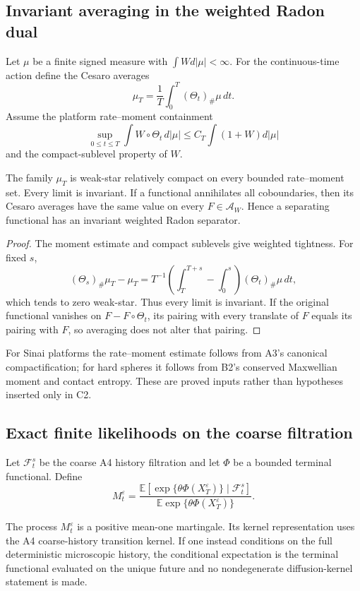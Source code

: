 \subsection{Invariant averaging in the weighted Radon dual}

Let $\mu$ be a finite signed measure with $\int Wd|\mu|<\infty$.  For the
continuous-time action define the Cesaro averages
\[
 \mu_T=\frac1T\int_0^T(\Theta_t)_\#\mu\,dt.
\]
Assume the platform rate--moment containment
\[
 \sup_{0\le t\le T}\int W\circ\Theta_t\,d|\mu|
 \le C_T\int(1+W)d|\mu|
\]
and the compact-sublevel property of $W$.

\begin{lemma}
\label{lem:r7-c2-average}
The family $\mu_T$ is weak-star relatively compact on every bounded
rate--moment set.  Every limit is invariant.  If a functional annihilates all
coboundaries, then its Cesaro averages have the same value on every
$F\in\mathscr A_W$.  Hence a separating functional has an invariant weighted
Radon separator.
\end{lemma}

\begin{proof}
The moment estimate and compact sublevels give weighted tightness.  For fixed
$s$,
\[
 (\Theta_s)_\#\mu_T-\mu_T
 =T^{-1}\left(\int_T^{T+s}-\int_0^s\right)(\Theta_t)_\#\mu\,dt,
\]
which tends to zero weak-star.  Thus every limit is invariant.  If the original
functional vanishes on $F-F\circ\Theta_t$, its pairing with every translate of
$F$ equals its pairing with $F$, so averaging does not alter that pairing.
\end{proof}

For Sinai platforms the rate--moment estimate follows from A3's canonical
compactification; for hard spheres it follows from B2's conserved Maxwellian
moment and contact entropy.  These are proved inputs rather than hypotheses
inserted only in C2.

\subsection{Exact finite likelihoods on the coarse filtration}

Let $\mathcal F_t^s$ be the coarse A4 history filtration and let $\Phi$ be a
bounded terminal functional.  Define
\[
 M_t^\varepsilon=
 \frac{\mathbb E[\exp\{\theta\Phi(X_T^\varepsilon)\}
      \mid\mathcal F_t^s]}
      {\mathbb E\exp\{\theta\Phi(X_T^\varepsilon)\}}.
\]

\begin{lemma}
\label{lem:r7-c2-likelihood}
The process $M_t^\varepsilon$ is a positive mean-one martingale.  Its kernel
representation uses the A4 coarse-history transition kernel.  If one instead
conditions on the full deterministic microscopic history, the conditional
expectation is the terminal functional evaluated on the unique future and no
nondegenerate diffusion-kernel statement is made.
\end{lemma}

